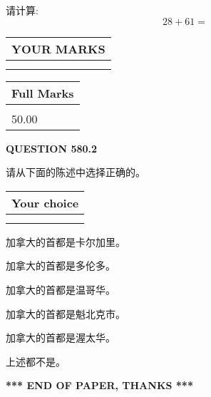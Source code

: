 \documentclass{ctexart}
\begin{document}
  
 
请计算:
\begin{equation}
28 +  %
61 = \nonumber
\end{equation}
 

 

 
  
\vspace{0.2in}
  
\noindent\begin{tabular}{|l|}
\hline
 YOUR MARKS  \\
\hline
 \\ 
 \\ 
\hline
\end{tabular}
\hspace{0.05in} \begin{tabular}{|l|}
\hline
 Full Marks  \\
\hline
 \\ 
50.00 \\
\hline
\end{tabular}
{\textbf{\Large{QUESTION
580.2 
}}}
  
  
请从下面的陈述中选择正确的。
  
  
\noindent\hspace{3.0in} \begin{tabular}{|l|}
\hline
Your choice \\
\hline
 \\ 
 \\ 
\hline
\end{tabular}
  
  
 
 
加拿大的首都是卡尔加里。
 
 
加拿大的首都是多伦多。
 
 
加拿大的首都是温哥华。
 
 
加拿大的首都是魁北克市。
 
 
加拿大的首都是渥太华。
 
 
 上述都不是。
 
 
   
   
 \vspace{0.2in}
 
   
   
   
   
\vspace{1.0in} 
{\textbf{\large{ *** END OF PAPER, THANKS *** }}} 
   
\end{document}
